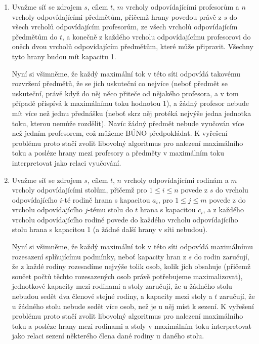 \documentclass[12pt,a4paper]{article}
\theoremstyle{plain}
\begin{document}
\begin{enumerate}[1.]
\item Uvažme síť se zdrojem $s$, cílem $t$, $m$ vrcholy odpovídajícími profesorům a $n$ vrcholy odpovídajícími předmětům, přičemž hrany povedou právě z $s$ do všech vrcholů odpovídajícím profesorům, ze všech vrcholů odpovídajícím předmětům do $t$, a konečně z každého vrcholu odpovídajícímu profesorovi do oněch dvou vrcholů odpovídajícím předmětům, které může připravit. Všechny tyto hrany budou mít kapacitu 1.\par
Nyní si všimněme, že každý maximální tok v této síti odpovídá takovému rozvržení předmětů, že se jich uskuteční co nejvíce (neboť předmět se uskuteční, právě když do něj něco přiteče od nějakého profesora, a v tom případě přispívá k maximálnímu toku hodnotou 1), a žádný profesor nebude mít více než jednu přednášku (neboť skrz něj protéká nejvýše jedna jednotka toku, kterou nemůže rozdělit). Navíc žádný předmět nebude vyučován více než jedním profesorem, což můžeme BÚNO předpokládat. K vyřešení problému proto stačí zvolit libovolný algoritmus pro nalezení maximálního toku a posléze hrany mezi profesory a předměty v maximálním toku interpretovat jako relaci vyučování.

\item Uvažme síť se zdrojem $s$, cílem $t$, $n$ vrcholy odpovídajícími rodinám a $m$ vrcholy odpovídajícími stolům, přičemž pro $1\leq i\leq n$ povede z $s$ do vrcholu odpovídajícího $i$-té rodině hrana s kapacitou $a_i$, pro $1\leq j\leq m$ povede z do vrcholu odpovídajícího $j$-tému stolu do $t$ hrana s kapacitou $c_i$, a z každého vrcholu odpovídajícího rodině povede do každého vrcholu odpovídajícího stolu hrana s kapacitou 1 (a žádné další hrany v síti nebudou).\par
Nyní si všimněme, že každý maximální tok v této síti odpovídá maximálnímu rozesazení splňujícímu podmínky, neboť kapacity hran z $s$ do rodin zaručují, že z každé rodiny rozesadíme nejvýše tolik osob, kolik jich obsahuje (přičemž součet počtů těchto rozesazených osob právě potřebujeme maximalizovat), jednotkové kapacity mezi rodinami a stoly zaručují, že u žádného stolu nebudou sedět dva členové stejné rodiny, a kapacity mezi stoly a $t$ zaručují, že u žádného stolu nebude sedět více osob, než je u něj míst k sezení. K vyřešení problému proto stačí zvolit libovolný algoritmus pro nalezení maximálního toku a posléze hrany mezi rodinami a stoly v maximálním toku interpretovat jako relaci sezení některého člena dané rodiny u daného stolu.


\end{enumerate}
\end{document}
